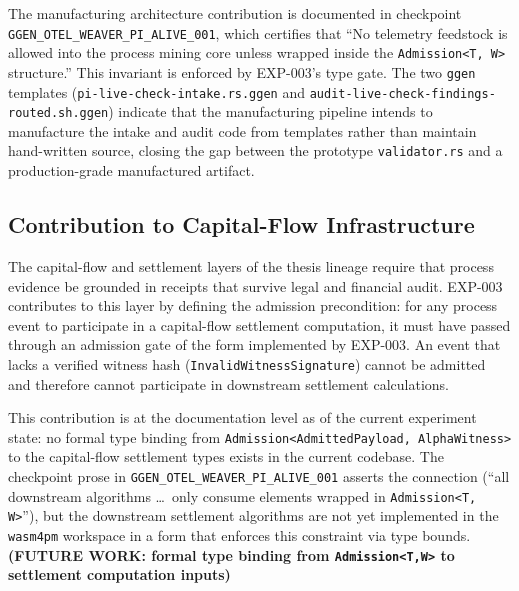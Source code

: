 The manufacturing architecture contribution is documented in checkpoint
\texttt{GGEN\_OTEL\_WEAVER\_PI\_ALIVE\_001}, which certifies that ``No telemetry
feedstock is allowed into the process mining core unless wrapped inside the
\texttt{Admission<T, W>} structure.'' This invariant is enforced by EXP-003's type
gate. The two \texttt{ggen} templates (\texttt{pi-live-check-intake.rs.ggen} and
\texttt{audit-live-check-findings-routed.sh.ggen}) indicate that the manufacturing
pipeline intends to manufacture the intake and audit code from templates rather than
maintain hand-written source, closing the gap between the prototype
\texttt{validator.rs} and a production-grade manufactured artifact.

\subsection{Contribution to Capital-Flow Infrastructure}
\label{sec:otel-weaver-exp-003-live-check-to-refusal-contribution-capital}

The capital-flow and settlement layers of the thesis lineage require that process
evidence be grounded in receipts that survive legal and financial audit. EXP-003
contributes to this layer by defining the admission precondition: for any process
event to participate in a capital-flow settlement computation, it must have passed
through an admission gate of the form implemented by EXP-003. An event that lacks
a verified witness hash (\texttt{InvalidWitnessSignature}) cannot be admitted and
therefore cannot participate in downstream settlement calculations.

This contribution is at the documentation level as of the current experiment state:
no formal type binding from \texttt{Admission<AdmittedPayload, AlphaWitness>} to
the capital-flow settlement types exists in the current codebase. The checkpoint
prose in \texttt{GGEN\_OTEL\_WEAVER\_PI\_ALIVE\_001} asserts the connection
(``all downstream algorithms \ldots\ only consume elements wrapped in
\texttt{Admission<T, W>}''), but the downstream settlement algorithms are not yet
implemented in the \texttt{wasm4pm} workspace in a form that enforces this
constraint via type bounds. \textbf{(FUTURE WORK: formal type binding from
\texttt{Admission<T,W>} to settlement computation inputs)}
